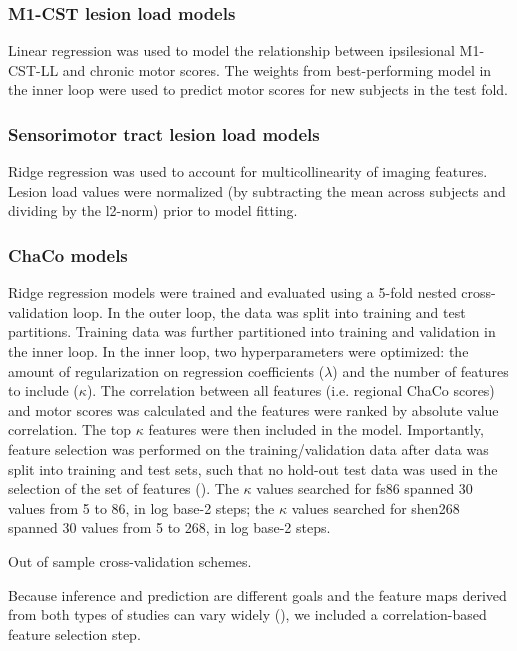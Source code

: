 \documentclass[10pt]{article}
\begin{document}
\subsubsection*{M1-CST lesion load models}
Linear regression was used to model the relationship between ipsilesional M1-CST-LL and chronic motor scores. The weights from best-performing model in the inner loop were used to predict motor scores for new subjects in the test fold. 

\subsubsection*{Sensorimotor tract lesion load models}
Ridge regression was used to account for multicollinearity of imaging features. Lesion load values were normalized (by subtracting the mean across subjects and dividing by the l2-norm) prior to model fitting.

\subsubsection*{ChaCo models}

Ridge regression models were trained and evaluated using a 5-fold nested cross-validation loop. In the outer loop, the data was split into training and test partitions. Training data was further partitioned into training and validation in the inner loop. In the inner loop, two hyperparameters were optimized: the amount of regularization on regression coefficients ($\lambda$) and the number of features to include ($\kappa$). The correlation between all features (i.e. regional ChaCo scores) and motor scores was calculated and the features were ranked by absolute value correlation. The top $\kappa$ features were then included in the model. Importantly, feature selection was performed on the training/validation data after data was split into training and test sets, such that no hold-out test data was used in the selection of the set of features (\cite{Hastie2001-or}). The $\kappa$ values searched for fs86 spanned 30 values from 5 to 86, in log base-2 steps; the $\kappa$ values searched for shen268 spanned 30 values from 5 to 268, in log base-2 steps. 

Out of sample cross-validation schemes.

Because inference and prediction are different goals and the feature maps derived from both types of studies can vary widely (\cite{Sperber2021-lw, Bzdok2020-py}), we included a correlation-based feature selection step. 
\end{document}
